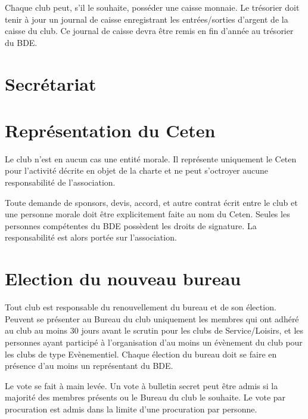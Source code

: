 \documentclass{article}
\begin{document}
\begin{multicols}{2}
{			Chaque club peut, s’il le souhaite, posséder une caisse
			monnaie. Le trésorier doit tenir à jour un journal de caisse
			enregistrant les entrées/sorties d’argent de la caisse du
			club. Ce journal de caisse devra être remis en fin d’année au
			trésorier du BDE\@.

		}

		\section{Secrétariat}
\label{sec:secretariat}

		\section{Représentation du Ceten}
\label{sec:representation}

		{\small

			Le club n’est en aucun cas une entité morale. Il représente
			uniquement le Ceten pour l’activité décrite en objet de la charte et
			ne peut s’octroyer aucune responsabilité de l’association.

			Toute demande de sponsors, devis, accord, et autre contrat
			écrit entre le club et une personne morale doit être
			explicitement faite au nom du Ceten. Seules les personnes
			compétentes du BDE possèdent les droits de signature. La
			responsabilité est alors portée sur l’association.

		}

		\section{Election du nouveau bureau}

		{\small

			Tout club est responsable du renouvellement du bureau et
			de son élection. Peuvent se présenter au Bureau du club
			uniquement les membres qui ont adhéré au club au moins
			30 jours avant le scrutin pour les clubs de Service/Loisirs, et
			les personnes ayant participé à l’organisation d’au moins un
			évènement du club pour les clubs de type Evènementiel.
			Chaque élection du bureau doit se faire en présence d’au
			moins un représentant du BDE\@.

			Le vote se fait à main levée. Un vote à bulletin secret peut
			être admis si la majorité des membres présents ou le Bureau
			du club le souhaite. Le vote par procuration est admis dans
			la limite d’une procuration par personne.

}
\end{multicols}
\end{document}
